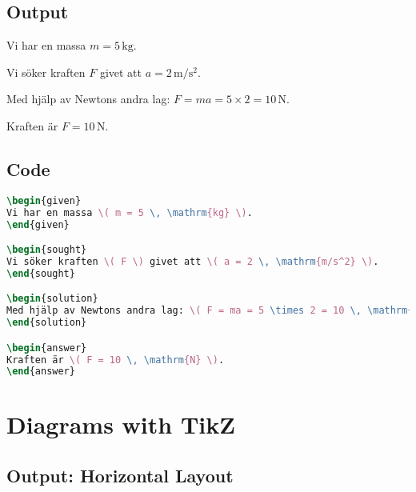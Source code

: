 \documentclass[swedish]{article}
\begin{document}
\subsection{Output}

\begin{given}
Vi har en massa \( m = 5 \, \mathrm{kg} \).
\end{given}

\begin{sought}
Vi söker kraften \( F \) givet att \( a = 2 \, \mathrm{m/s^2} \).
\end{sought}

\begin{solution}
Med hjälp av Newtons andra lag: \( F = ma = 5 \times 2 = 10 \, \mathrm{N} \).
\end{solution}

\begin{answer}
Kraften är \( F = 10 \, \mathrm{N} \).
\end{answer}

\subsection{Code}

\begin{lstlisting}[language=TeX]
\begin{given}
Vi har en massa \( m = 5 \, \mathrm{kg} \).
\end{given}

\begin{sought}
Vi söker kraften \( F \) givet att \( a = 2 \, \mathrm{m/s^2} \).
\end{sought}

\begin{solution}
Med hjälp av Newtons andra lag: \( F = ma = 5 \times 2 = 10 \, \mathrm{N} \).
\end{solution}

\begin{answer}
Kraften är \( F = 10 \, \mathrm{N} \).
\end{answer}
\end{lstlisting}

\section{Diagrams with TikZ}

\subsection{Output: Horizontal Layout}
\end{document}
